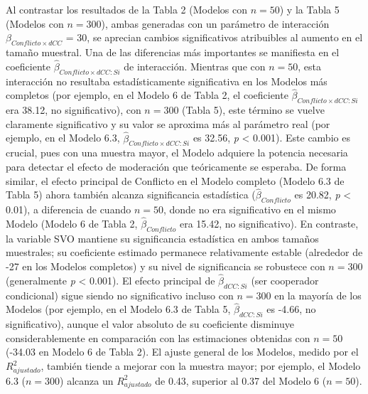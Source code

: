 \documentclass[
  spanish,
  10pt,
]{article}
\begin{document}
Al contrastar los resultados de la Tabla 2 (Modelos con \(n=50\)) y la
Tabla 5 (Modelos con \(n=300\)), ambas generadas con un parámetro de
interacción \(\beta_{Conflicto \times dCC}\) = 30, se aprecian cambios
significativos atribuibles al aumento en el tamaño muestral. Una de las
diferencias más importantes se manifiesta en el coeficiente
\(\hat\beta_{Conflicto \times dCC:Si}\) de interacción. Mientras que con
\(n=50\), esta interacción no resultaba estadísticamente significativa
en los Modelos más completos (por ejemplo, en el Modelo 6 de Tabla 2, el
coeficiente \(\hat{\beta}_{Conflicto \times dCC:Si}\) era 38.12, no
significativo), con \(n=300\) (Tabla 5), este término se vuelve
claramente significativo y su valor se aproxima más al parámetro real
(por ejemplo, en el Modelo 6.3,
\(\hat{\beta}_{Conflicto \times dCC:Si}\) es 32.56, \emph{p} \textless{}
0.001). Este cambio es crucial, pues con una muestra mayor, el Modelo
adquiere la potencia necesaria para detectar el efecto de moderación que
teóricamente se esperaba. De forma similar, el efecto principal de
Conflicto en el Modelo completo (Modelo 6.3 de Tabla 5) ahora también
alcanza significancia estadística (\(\hat{\beta}_{Conflicto}\) es 20.82,
\emph{p} \textless{} 0.01), a diferencia de cuando \(n=50\), donde no
era significativo en el mismo Modelo (Modelo 6 de Tabla 2,
\(\hat{\beta}_{Conflicto}\) era 15.42, no significativo). En contraste,
la variable SVO mantiene su significancia estadística en ambos tamaños
muestrales; su coeficiente estimado permanece relativamente estable
(alrededor de -27 en los Modelos completos) y su nivel de significancia
se robustece con \(n=300\) (generalmente \emph{p} \textless{} 0.001). El
efecto principal de \(\hat\beta_{dCC:Si}\) (ser cooperador condicional)
sigue siendo no significativo incluso con \(n=300\) en la mayoría de los
Modelos (por ejemplo, en el Modelo 6.3 de Tabla 5,
\(\hat{\beta}_{dCC:Si}\) es -4.66, no significativo), aunque el valor
absoluto de su coeficiente disminuye considerablemente en comparación
con las estimaciones obtenidas con \(n=50\) (-34.03 en Modelo 6 de Tabla
2). El ajuste general de los Modelos, medido por el \(R^2_{ajustado}\),
también tiende a mejorar con la muestra mayor; por ejemplo, el Modelo
6.3 (\(n=300\)) alcanza un \(R^2_{ajustado}\) de 0.43, superior al 0.37
del Modelo 6 (\(n=50\)).
\end{document}
